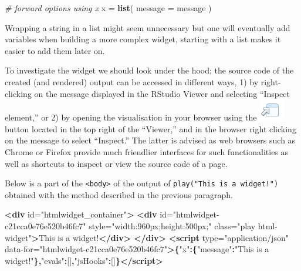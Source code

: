 \documentclass[
]{krantz}
\makeatletter
\newenvironment{Shaded}{\begin{snugshade}}{\end{snugshade}}
\newcommand{\CommentTok}[1]{\textcolor[rgb]{0.37,0.37,0.37}{\textit{#1}}}
\newcommand{\DataTypeTok}[1]{\textcolor[rgb]{0.27,0.27,0.27}{#1}}
\newcommand{\KeywordTok}[1]{\textcolor[rgb]{0.27,0.27,0.27}{\textbf{#1}}}
\newcommand{\NormalTok}[1]{#1}
\newcommand{\OperatorTok}[1]{\textcolor[rgb]{0.43,0.43,0.43}{\textbf{#1}}}
\newcommand{\OtherTok}[1]{\textcolor[rgb]{0.37,0.37,0.37}{#1}}
\newcommand{\StringTok}[1]{\textcolor[rgb]{0.5,0.5,0.5}{#1}}
\newenvironment{kframe}{%
\medskip{}
\setlength{\fboxsep}{.8em}
 \def\at@end@of@kframe{}%
 \ifinner\ifhmode%
  \def\at@end@of@kframe{\end{minipage}}%
  \begin{minipage}{\columnwidth}%
 \fi\fi%
 \def\FrameCommand##1{\hskip\@totalleftmargin \hskip-\fboxsep
 \colorbox{shadecolor}{##1}\hskip-\fboxsep
     \hskip-\linewidth \hskip-\@totalleftmargin \hskip\columnwidth}%
 \MakeFramed {\advance\hsize-\width
   \@totalleftmargin\z@ \linewidth\hsize
   \@setminipage}}%
 {\par\unskip\endMakeFramed%
 \at@end@of@kframe}
\renewenvironment{Shaded}{\begin{kframe}}{\end{kframe}}
\makeatother
\begin{document}
\begin{Shaded}
\begin{Highlighting}[]
\CommentTok{\# forward options using x}
\NormalTok{x =}\StringTok{ }\KeywordTok{list}\NormalTok{(}
  \DataTypeTok{message =}\NormalTok{ message}
\NormalTok{)}
\end{Highlighting}
\end{Shaded}

Wrapping a string in a list might seem unnecessary but one will eventually add variables when building a more complex widget, starting with a list makes it easier to add them later on.

To investigate the widget we should look under the hood; the source code of the created (and rendered) output can be accessed in different ways, 1) by right-clicking on the message displayed in the RStudio Viewer and selecting ``Inspect element,'' or 2) by opening the visualisation in your browser using the \includegraphics{images/open-in-browser.png} button located in the top right of the ``Viewer,'' and in the browser right clicking on the message to select ``Inspect.'' The latter is advised as web browsers such as Chrome or Firefox provide much friendlier interfaces for such functionalities as well as shortcuts to inspect or view the source code of a page.

Below is a part of the \texttt{\textless{}body\textgreater{}} of the output of \texttt{play("This\ is\ a\ widget!")} obtained with the method described in the previous paragraph.

\begin{Shaded}
\begin{Highlighting}[]
\KeywordTok{<div}\OtherTok{ id=}\StringTok{"htmlwidget\_container"}\KeywordTok{>}
  \KeywordTok{<div}\OtherTok{ id=}\StringTok{"htmlwidget{-}c21cca0e76e520b46fc7"}\OtherTok{ style=}\StringTok{"width:960px;height:500px;"}\OtherTok{ class=}\StringTok{"play html{-}widget"}\KeywordTok{>}\NormalTok{This is a widget!}\KeywordTok{</div>}
\KeywordTok{</div>}
\KeywordTok{<script}\OtherTok{ type=}\StringTok{"application/json"}\OtherTok{ data{-}for=}\StringTok{"htmlwidget{-}c21cca0e76e520b46fc7"}\KeywordTok{>}\OperatorTok{\{}\StringTok{"x"}\OperatorTok{:\{}\StringTok{"message"}\OperatorTok{:}\StringTok{"This is a widget!"}\OperatorTok{\},}\StringTok{"evals"}\OperatorTok{:}\NormalTok{[]}\OperatorTok{,}\StringTok{"jsHooks"}\OperatorTok{:}\NormalTok{[]}\OperatorTok{\}}\KeywordTok{</script>}
\end{Highlighting}
\end{Shaded}
\end{document}
